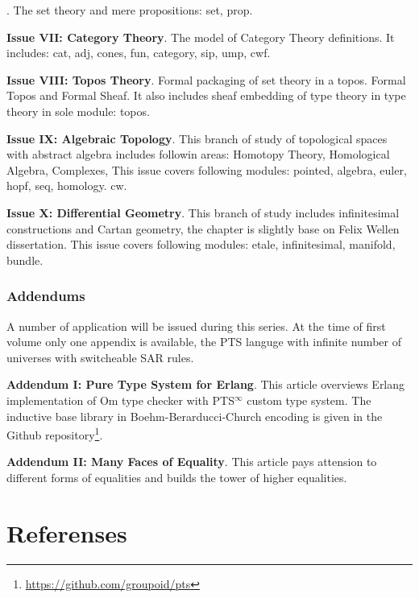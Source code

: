 \documentclass[twoside]{article}
\theoremstyle{definition}
\begin{document}
.
The set theory and mere propositions: set, prop.

{\bf Issue VII: Category Theory}.
The model of Category Theory definitions.
It includes: cat, adj, cones, fun, category, sip, ump, cwf.

{\bf Issue VIII: Topos Theory}.
Formal packaging of set theory in a topos. Formal Topos and Formal Sheaf.
It also includes sheaf embedding of type theory in type theory in sole module: topos.

{\bf Issue IX: Algebraic Topology}. This branch of study of topological spaces with abstract algebra
includes followin areas: Homotopy Theory, Homological Algebra, Complexes,
This issue covers following modules: pointed, algebra, euler, hopf, seq, homology. cw.

{\bf Issue X: Differential Geometry}. This branch of study includes
infinitesimal constructions and Cartan geometry, the chapter is
slightly base on Felix Wellen dissertation.
This issue covers following modules: etale, infinitesimal, manifold, bundle.

\subsubsection*{Addendums}

A number of application will be issued during this series. At the time
of first volume only one appendix is available, the PTS languge with
infinite number of universes with switcheable SAR rules.

{\bf Addendum I: Pure Type System for Erlang}.
This article overviews Erlang  implementation of Om type
checker with PTS$^\infty$ custom type system. The inductive base library
in Boehm-Berarducci-Church encoding is given in the Github
repository\footnote{\url{https://github.com/groupoid/pts}}.

{\bf Addendum II: Many Faces of Equality}.
This article pays attension to different forms of equalities
and builds the tower of higher equalities.

\section*{Referenses}
\renewcommand{\bibname}{References}


\end{document}
